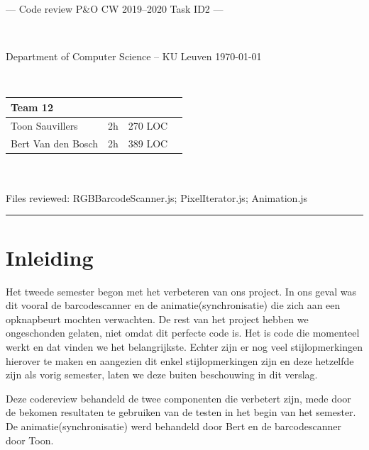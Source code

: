 \documentclass[a4paper,11pt]{article}
\begin{document}
    \noindent
    \colorbox[HTML]{52BDEC}{\bfseries\parbox{\textwidth}{\centering\large
      --- Code review P\&O CW 2019--2020 Task ID2 ---
    }}
    \\[-1mm]
    \colorbox[HTML]{00407A}{\bfseries\color{white}\parbox{\textwidth}{
      Department of Computer Science -- KU Leuven
      \hfill
      \today
    }}
    \\

    \smallskip

    \noindent
    \begin{tabular}{*4l}
    \toprule
    \multicolumn{3}{l}{\large\textbf{Team 12}} \\
    \midrule
    Toon Sauvillers & 2h & 270 LOC \\ %
    Bert Van den Bosch & 2h & 389 LOC \\
    \bottomrule
    \hline
    \end{tabular}\\
    \\
    Files reviewed: RGBBarcodeScanner.js; PixelIterator.js; Animation.js

    \noindent
    {\color[HTML]{52BDEC} \rule{\linewidth}{1mm} }

    \smallskip
    \section{Inleiding}
    Het tweede semester begon met het verbeteren van ons project. In ons geval was dit vooral de barcodescanner en de animatie(synchronisatie) die zich aan een opknapbeurt mochten verwachten. De rest van het project hebben we ongeschonden gelaten, niet omdat dit perfecte code is. Het is code die momenteel werkt en dat vinden we het belangrijkste. Echter zijn er nog veel stijlopmerkingen hierover te maken en aangezien dit enkel stijlopmerkingen zijn en deze hetzelfde zijn als vorig semester, laten we deze buiten beschouwing in dit verslag.

    Deze codereview behandeld de twee componenten die verbetert zijn, mede door de bekomen resultaten te gebruiken van de testen in het begin van het semester. De animatie(synchronisatie) werd behandeld door Bert en de barcodescanner door Toon.
\end{document}
